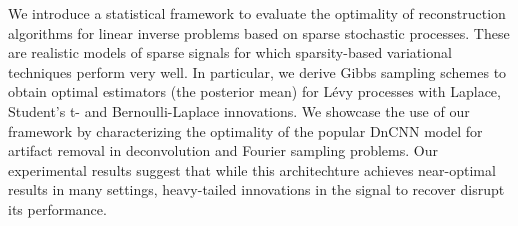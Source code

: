 We introduce a statistical framework to evaluate the optimality
of reconstruction algorithms for linear inverse problems based
on sparse stochastic processes. These are realistic models
of sparse signals for which sparsity-based variational
techniques perform very well. In particular, we derive Gibbs
sampling schemes to obtain optimal estimators (the posterior
mean) for L\'{e}vy processes with Laplace, Student's t- and
Bernoulli-Laplace innovations. We showcase the use of our
framework by characterizing the optimality of the popular
DnCNN model for artifact removal in deconvolution and Fourier
sampling problems. Our experimental results suggest that while
this architechture achieves near-optimal results in many settings,
heavy-tailed innovations in the signal to recover disrupt its
performance.
